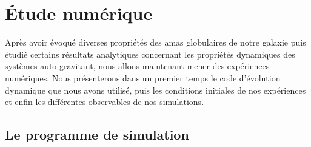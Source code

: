 \chapter{Étude numérique}
\label{Chap::Simu::Analysis}
	\minitoc

	Après avoir évoqué diverses propriétés des amas globulaires de notre galaxie puis étudié certains résultats
	analytiques concernant les propriétés dynamiques des systèmes auto-gravitant, nous allons maintenant mener des
	expériences numériques. Nous présenterons dans un premier temps le code d'évolution dynamique que nous avons
	utilisé, puis les conditions initiales de nos expériences et enfin les différentes observables de nos simulations.





	\section{Le programme de simulation}


